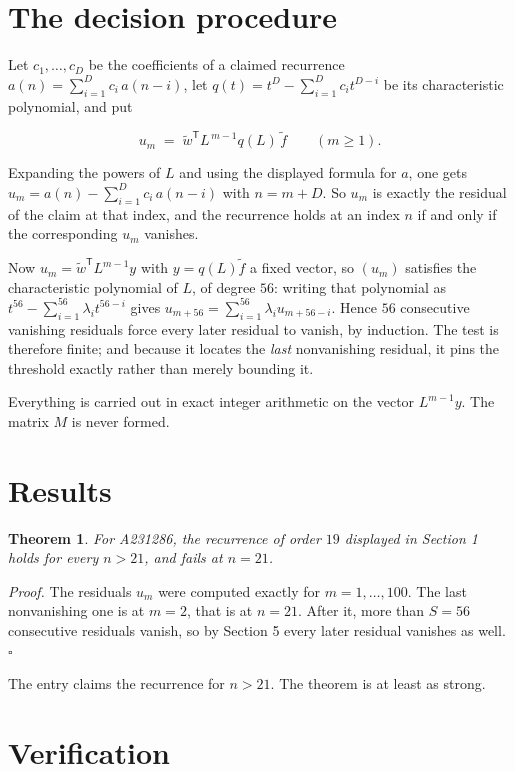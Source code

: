 \documentclass[11pt]{article}
\newtheorem{theorem}{Theorem}
\theoremstyle{definition}
\begin{document}
\section{The decision procedure}

Let $c_1,\dots,c_D$ be the coefficients of a claimed recurrence $a(n) = \sum_{i=1}^{D} c_i\,a(n-i)$, let $q(t) = t^{D} - \sum_{i=1}^{D} c_i t^{D-i}$ be its characteristic polynomial, and put

\[u_m \;=\; \tilde w^{\mathsf T} L^{\,m-1} q(L)\,\tilde f \qquad (m \ge 1).\]

Expanding the powers of $L$ and using the displayed formula for $a$, one gets $u_m = a(n) - \sum_{i=1}^{D} c_i\,a(n-i)$ with $n = m + D$. So $u_m$ is exactly the residual of the claim at that index, and the recurrence holds at an index $n$ if and only if the corresponding $u_m$ vanishes.

Now $u_m = \tilde w^{\mathsf T} L^{m-1} y$ with $y = q(L)\tilde f$ a fixed vector, so $(u_m)$ satisfies the characteristic polynomial of $L$, of degree $56$: writing that polynomial as $t^{56} - \sum_{i=1}^{56} \lambda_i t^{56-i}$ gives $u_{m+56} = \sum_{i=1}^{56} \lambda_i u_{m+56-i}$. Hence $56$ consecutive vanishing residuals force every later residual to vanish, by induction. The test is therefore finite; and because it locates the {\itshape last} nonvanishing residual, it pins the threshold exactly rather than merely bounding it.

Everything is carried out in exact integer arithmetic on the vector $L^{m-1}y$. The matrix $M$ is never formed.

\section{Results}

\begin{theorem} For A231286, the recurrence of order $19$ displayed in Section 1 holds for every $n > 21$, and fails at $n = 21$.\end{theorem}

{\itshape Proof.} The residuals $u_m$ were computed exactly for $m = 1,\dots,100$. The last nonvanishing one is at $m = 2$, that is at $n = 21$. After it, more than $S = 56$ consecutive residuals vanish, so by Section 5 every later residual vanishes as well. $\square$

The entry claims the recurrence for $n > 21$. The theorem is at least as strong.

\section{Verification}
\end{document}
